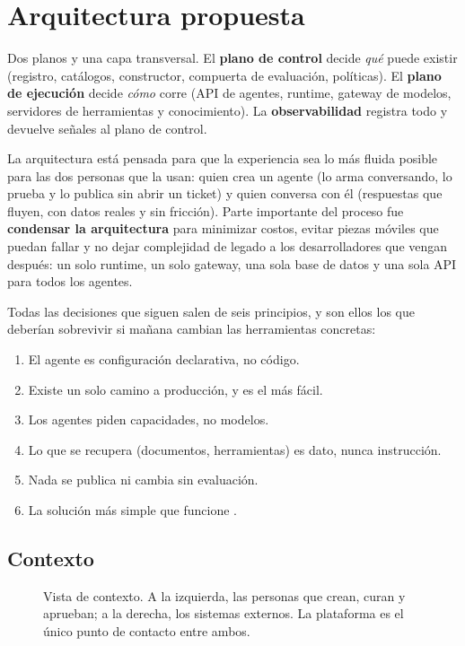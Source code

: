 \section{Arquitectura propuesta}
\label{sec:arq}
\begin{respuesta}
Dos planos y una capa transversal. El \textbf{plano de control} decide \emph{qué} puede existir
(registro, catálogos, constructor, compuerta de evaluación, políticas). El \textbf{plano de
ejecución} decide \emph{cómo} corre (API de agentes, runtime, gateway de modelos, servidores
de herramientas y conocimiento). La \textbf{observabilidad} registra todo y devuelve señales
al plano de control.
\end{respuesta}

La arquitectura está pensada para que la experiencia sea lo más fluida posible para las dos
personas que la usan: quien crea un agente (lo arma conversando, lo prueba y lo publica sin
abrir un ticket) y quien conversa con él (respuestas que fluyen, con datos reales y sin
fricción). Parte importante del proceso fue \textbf{condensar la arquitectura} para minimizar
costos, evitar piezas móviles que puedan fallar y no dejar complejidad de legado a los
desarrolladores que vengan después: un solo runtime, un solo gateway, una sola base de datos
y una sola API para todos los agentes.

Todas las decisiones que siguen salen de seis principios, y son ellos los que deberían
sobrevivir si mañana cambian las herramientas concretas:
\begin{enumerate}[label=\textbf{P\arabic*.}, leftmargin=2.2em]
  \item El agente es configuración declarativa, no código.
  \item Existe un solo camino a producción, y es el más fácil.
  \item Los agentes piden capacidades, no modelos.
  \item Lo que se recupera (documentos, herramientas) es dato, nunca instrucción.
  \item Nada se publica ni cambia sin evaluación.
  \item La solución más simple que funcione \citep{anthropic2024effective}.
\end{enumerate}

\subsection{Contexto}
\begin{figure}[!htbp]
  \centering
  
  \caption{Vista de contexto. A la izquierda, las personas que crean, curan y aprueban; a la
  derecha, los sistemas externos. La plataforma es el único punto de contacto entre ambos.}
  \label{fig:contexto}
\end{figure}

